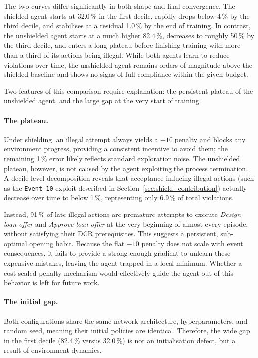 The two curves differ significantly in both shape and final convergence. The shielded agent starts at 32.0\,\% in the first decile, rapidly drops below 4\,\% by the third decile, and stabilises at a residual 1.0\,\% by the end of training. In contrast, the unshielded agent starts at a much higher 82.4\,\%, decreases to roughly 50\,\% by the third decile, and enters a long plateau before finishing training with more than a third of its actions being illegal. While both agents learn to reduce violations over time, the unshielded agent remains orders of magnitude above the shielded baseline and shows no signs of full compliance within the given budget.

Two features of this comparison require explanation: the persistent plateau of the unshielded agent, and the large gap at the very start of training.

\paragraph{The plateau.}
Under shielding, an illegal attempt always yields a $-10$ penalty and blocks any environment progress, providing a consistent incentive to avoid them; the remaining 1\,\% error likely reflects standard exploration noise. The unshielded plateau, however, is not caused by the agent exploiting the process termination. A decile-level decomposition reveals that acceptance-inducing illegal actions (such as the \texttt{Event\_10} exploit described in Section~\ref{sec:shield_contribution}) actually decrease over time to below 1\,\%, representing only 6.9\,\% of total violations.

Instead, 91\,\% of late illegal actions are premature attempts to execute \textit{Design loan offer} and \textit{Approve loan offer} at the very beginning of almost every episode, without satisfying their DCR prerequisites. This suggests a persistent, sub-optimal opening habit. Because the flat $-10$ penalty does not scale with event consequences, it fails to provide a strong enough gradient to unlearn these expensive mistakes, leaving the agent trapped in a local minimum. Whether a cost-scaled penalty mechanism would effectively guide the agent out of this behavior is left for future work.

\paragraph{The initial gap.}
Both configurations share the same network architecture, hyperparameters, and random seed, meaning their initial policies are identical. Therefore, the wide gap in the first decile (82.4\,\% versus 32.0\,\%) is not an initialisation defect, but a result of environment dynamics.

